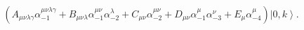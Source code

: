 \begin{equation}
(A_{\mu \nu \lambda \gamma }\alpha _{-1}^{\mu \nu \lambda \gamma }+B_{\mu
\nu \lambda }\alpha _{-1}^{\mu \nu }\alpha _{-2}^{\lambda }+C_{\mu \nu
}\alpha _{-2}^{\mu \nu }+D_{\mu \nu }\alpha _{-1}^{\mu }\alpha _{-3}^{\nu
}+E_{\mu }\alpha _{-4}^{\mu })\left\vert 0,k\right\rangle .  \tag{37}
\end{equation}%
